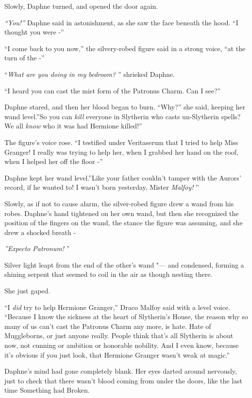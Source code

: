 Slowly, Daphne turned, and opened the door again.

\emph{``You!''} Daphne said in astonishment, as she saw the face beneath
the hood. ``I thought you were -''

``I come back to you now,'' the silvery-robed figure said in a strong
voice, ``at the turn of the -''

``\emph{What are you doing in my bedroom?} '' shrieked Daphne.

``I heard you can cast the mist form of the Patronus Charm. Can I see?''

Daphne stared, and then her blood began to burn. ``Why?'' she said,
keeping her wand level.''So you can \emph{kill} everyone in Slytherin
who casts un-Slytherin spells? We all \emph{know} who it was had
Hermione killed!''

The figure's voice rose. ``I testified under Veritaserum that I tried to
help Miss Granger! I really was trying to help her, when I grabbed her
hand on the roof, when I helped her off the floor -''

Daphne kept her wand level.''Like your father couldn't tamper with the
Aurors' record, if he wanted to! I wasn't born yesterday, Mister
\emph{Malfoy!} ''

Slowly, as if not to cause alarm, the silver-robed figure drew a wand
from his robes. Daphne's hand tightened on her own wand, but then she
recognized the position of the fingers on the wand, the stance the
figure was assuming, and she drew a shocked breath -

\emph{''Expecto Patronum!} ''

Silver light leapt from the end of the other's wand "--- and condensed,
forming a shining serpent that seemed to coil in the air as though
nesting there.

She just gaped.

``I \emph{did} try to help Hermione Granger,'' Draco Malfoy said with a
level voice. ``Because I know the sickness at the heart of Slytherin's
House, the reason why so many of us can't cast the Patronus Charm any
more, is hate. Hate of Muggleborns, or just anyone really. People think
that's all Slytherin is about now, not cunning or ambition or honorable
nobility. And I even know, because it's obvious if you just look, that
Hermione Granger wasn't weak at magic.''

Daphne's mind had gone completely blank. Her eyes darted around
nervously, just to check that there wasn't blood coming from under the
doors, like the last time Something had Broken.

